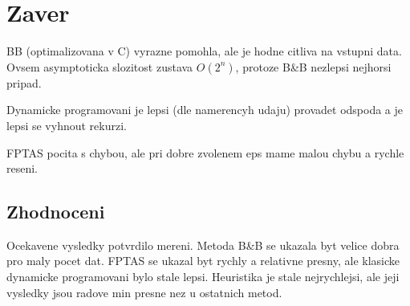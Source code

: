 \documentclass[12pt,a4paper]{article}
\begin{document}
\section{Zaver}
BB (optimalizovana v C) vyrazne pomohla, ale je hodne citliva na vstupni data. Ovsem asymptoticka slozitost zustava $O(2^n)$, protoze B\&B nezlepsi nejhorsi pripad.

Dynamicke programovani je lepsi (dle namerencyh udaju) provadet odspoda a je lepsi se vyhnout rekurzi.

FPTAS pocita s chybou, ale pri dobre zvolenem eps mame malou chybu a rychle reseni.

\subsection{Zhodnoceni}
Ocekavene vysledky potvrdilo mereni. Metoda B\&B se ukazala byt velice dobra pro maly pocet dat. FPTAS se ukazal byt rychly a relativne presny, ale klasicke dynamicke programovani bylo stale lepsi. Heuristika je stale nejrychlejsi, ale jeji vysledky jsou radove min presne nez u ostatnich metod.

\end{document}
